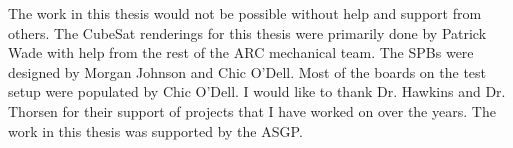 
The work in this thesis would not be possible without help and support from others. The CubeSat renderings for this thesis were primarily done by Patrick Wade with help from the rest of the \acs{ARC} mechanical team. The \aclp{SPB} were designed by Morgan Johnson and Chic O'Dell. Most of the boards on the test setup were populated by Chic O'Dell. I would like to thank Dr. Hawkins and Dr. Thorsen for their support of projects that I have worked on over the years. The work in this thesis was supported by the \acl{ASGP}.


